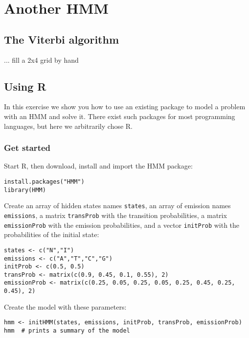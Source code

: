 \documentclass[a4paper,11pt]{article}
\begin{document}
\section{Another HMM}

\subsection{The Viterbi algorithm}

... fill a 2x4 grid by hand

\newpage

\subsection{Using R}

In this exercise we show you how to use an existing package to model a problem with an HMM and solve it. There exist such packages for most programming languages, but here we arbitrarily chose R.

\subsubsection{Get started}

Start R, then download, install and import the HMM package:

\begin{verbatim}
install.packages("HMM")
library(HMM)
\end{verbatim}

Create an array of hidden states names \texttt{states}, an array of emission names \texttt{emissions}, a matrix \texttt{transProb} with the transition probabilities, a matrix \texttt{emissionProb} 
with the emission probabilities, and a vector \texttt{initProb} with the probabilities of the initial state:

\begin{verbatim}
states <- c("N","I")
emissions <- c("A","T","C","G")
initProb <- c(0.5, 0.5)
transProb <- matrix(c(0.9, 0.45, 0.1, 0.55), 2)
emissionProb <- matrix(c(0.25, 0.05, 0.25, 0.05, 0.25, 0.45, 0.25, 0.45), 2)
\end{verbatim}

Create the model with these parameters:

\begin{verbatim}
hmm <- initHMM(states, emissions, initProb, transProb, emissionProb)
hmm  # prints a summary of the model
\end{verbatim}
\end{document}
